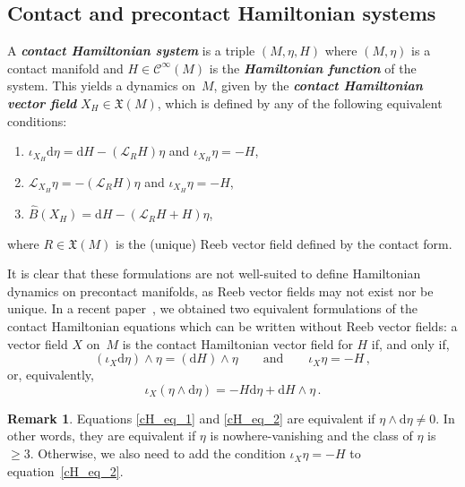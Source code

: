 \documentclass[11pt,twoside]{article}
\theoremstyle{plain}
\theoremstyle{definition}
\newtheorem{remark}[theorem]{Remark}
\renewcommand{\d}{\mathrm{d}}
\newcommand{\Cinfty}{\mathscr{C}^\infty}
\newcommand*{\inn}[1]{\iota_{#1}}
\newcommand{\Lie}{\mathscr{L}}
\newcommand{\X}{\mathfrak{X}}
\def\d{\mathrm{d}}
\newcommand\dfn[1]{{\textbf{\emph{#1}}}}
\def\X{\mathfrak{X}}
\def\d{\mathrm{d}}
\def\Lie{\mathscr{L}}
\begin{document}
\subsection{Contact and precontact Hamiltonian systems}\label{precontact_Hamiltonian}

A \dfn{contact Hamiltonian system} is a triple $(M,\eta,H)$
where $(M,\eta)$ is a contact manifold and 
$H \in \Cinfty(M)$ is the \dfn{Hamiltonian function} of the system.
This yields a dynamics on~$M$, given by the
\dfn{contact Hamiltonian vector field} $X_H \in \X(M)$,
which is defined by any of the following equivalent conditions:
\begin{enumerate}[(1)]
\item 
$\inn{X_H}\d\eta = \d H - (\Lie_R H)\eta$ \quad and \quad $\inn{X_H}\eta = -H$,
\item $\Lie_{X_H}\eta = -(\Lie_R H)\eta$ \quad and \quad $ \inn{X_H}\eta = -H$,
\item $\widehat B(X_H) = \d H - (\Lie_R H + H)\eta$, 
\end{enumerate}
where $R \in \X(M)$ is the (unique) Reeb vector field defined by the contact form.

It is clear that these formulations are not well-suited to define Hamiltonian dynamics on precontact manifolds, as Reeb vector fields may not exist nor be unique.
In a recent paper~\cite{GMRR_2025}, we obtained two equivalent formulations of the contact Hamiltonian equations which can be written without Reeb vector fields:
a vector field $X$ on~$M$ is the contact Hamiltonian vector field for $H$ if, and only if,
\begin{equation}\label{cH_eq_1}
    (\inn{X} \d \eta) \wedge \eta = (\d H) \wedge \eta 
				\qquad \text{and} \qquad
				\inn{X} \eta = -H \,,
\end{equation}
or, equivalently,
\begin{equation}\label{cH_eq_2}
    \inn{X} (\eta \wedge \d \eta) = - H \d \eta + \d H \wedge \eta\,.
\end{equation} 
\begin{remark}
    Equations \eqref{cH_eq_1} and \eqref{cH_eq_2} are equivalent if $\eta \wedge \d \eta \neq 0$. In other words, they are equivalent if $\eta$ is nowhere-vanishing and the class of $\eta$ is $\geq 3$. Otherwise, we also need to add the condition $\inn{X} \eta = -H$ to equation~\eqref{cH_eq_2}.  
\end{remark}
    
\end{document}
